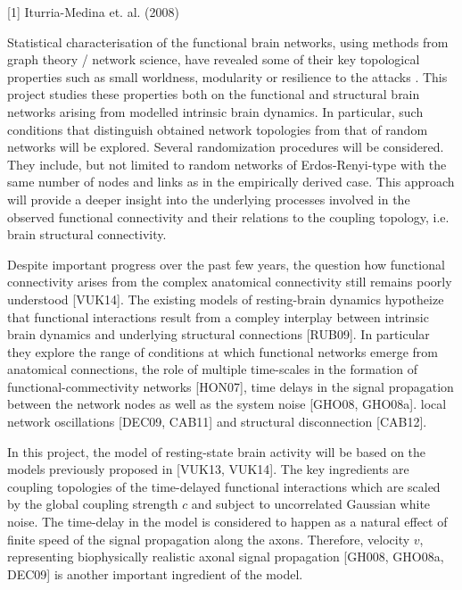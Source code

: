 [1] Iturria-Medina et. al. (2008)

Statistical characterisation of the functional brain networks, using methods from graph theory / network science, have revealed some of their key topological properties such as small worldness, modularity or resilience to the attacks \cite{BUL09}. This project studies these properties both on the functional and structural brain networks arising from modelled intrinsic brain dynamics. In particular, such conditions that distinguish obtained network topologies from that of random networks will be explored. Several randomization procedures will be considered. They include, but not limited to random networks of Erdos-Renyi-type with the same number of nodes and links as in the empirically derived case. This approach will provide a deeper insight into the underlying processes involved in the observed functional connectivity and their relations to the coupling topology, i.e. brain structural connectivity.

 
Despite important progress over the past few years, the question how functional connectivity arises from the complex anatomical connectivity still remains poorly understood [VUK14]. The existing models of resting-brain dynamics hypotheize that functional interactions result from a compley interplay between intrinsic brain dynamics and underlying structural connections [RUB09]. In particular they explore the range of conditions at which functional networks emerge from anatomical connections, the role of multiple time-scales in the formation of functional-commectivity networks [HON07], time delays in the signal propagation between the network nodes as well as the system noise [GHO08, GHO08a]. local network oscillations [DEC09, CAB11] and structural disconnection [CAB12].

In this project, the model of resting-state brain activity will be based on the models previously proposed in [VUK13, VUK14]. The key ingredients are coupling topologies of the time-delayed functional interactions which are scaled by the global coupling strength $c$ and subject to uncorrelated Gaussian white noise. The time-delay in the model is considered to happen as a natural effect of finite speed of the signal propagation along the axons. Therefore, velocity $v$, representing biophysically realistic axonal signal propagation [GH008, GHO08a, DEC09] is another important ingredient of the model. 

